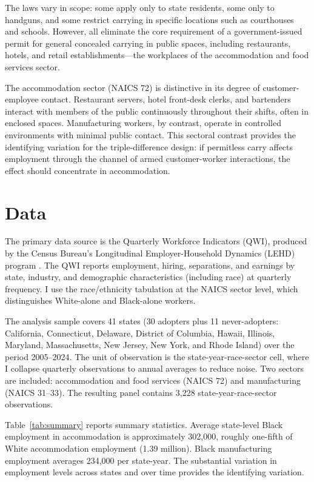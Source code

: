 \documentclass[12pt]{article}
\begin{document}
The laws vary in scope: some apply only to state residents, some only to handguns, and some restrict carrying in specific locations such as courthouses and schools. However, all eliminate the core requirement of a government-issued permit for general concealed carrying in public spaces, including restaurants, hotels, and retail establishments---the workplaces of the accommodation and food services sector.

The accommodation sector (NAICS 72) is distinctive in its degree of customer-employee contact. Restaurant servers, hotel front-desk clerks, and bartenders interact with members of the public continuously throughout their shifts, often in enclosed spaces. Manufacturing workers, by contrast, operate in controlled environments with minimal public contact. This sectoral contrast provides the identifying variation for the triple-difference design: if permitless carry affects employment through the channel of armed customer-worker interactions, the effect should concentrate in accommodation.

\section{Data}
\label{sec:data}

The primary data source is the Quarterly Workforce Indicators (QWI), produced by the Census Bureau's Longitudinal Employer-Household Dynamics (LEHD) program \citep{abowd2009lehd}. The QWI reports employment, hiring, separations, and earnings by state, industry, and demographic characteristics (including race) at quarterly frequency. I use the race/ethnicity tabulation at the NAICS sector level, which distinguishes White-alone and Black-alone workers.

The analysis sample covers 41 states (30 adopters plus 11 never-adopters: California, Connecticut, Delaware, District of Columbia, Hawaii, Illinois, Maryland, Massachusetts, New Jersey, New York, and Rhode Island) over the period 2005--2024. The unit of observation is the state-year-race-sector cell, where I collapse quarterly observations to annual averages to reduce noise. Two sectors are included: accommodation and food services (NAICS 72) and manufacturing (NAICS 31--33). The resulting panel contains 3,228 state-year-race-sector observations.



Table~\ref{tab:summary} reports summary statistics. Average state-level Black employment in accommodation is approximately 302,000, roughly one-fifth of White accommodation employment (1.39 million). Black manufacturing employment averages 234,000 per state-year. The substantial variation in employment levels across states and over time provides the identifying variation.
\end{document}
